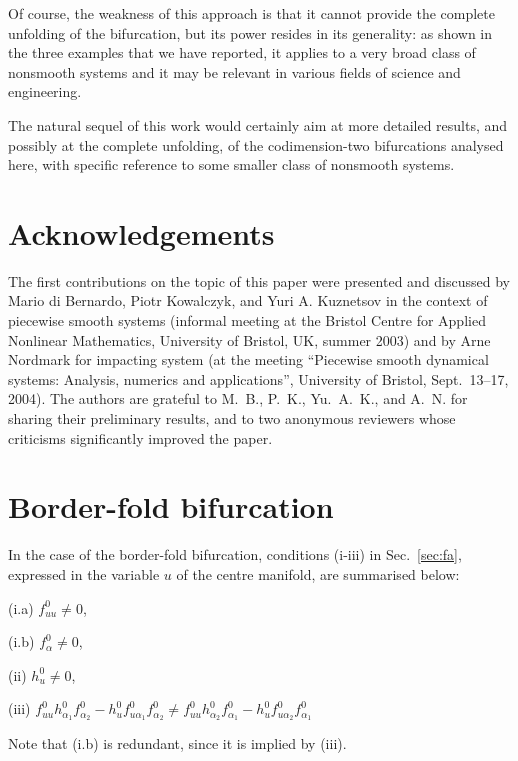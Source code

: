 \documentclass[final,onefignum]{siamltex}
\begin{document}
Of course, the weakness of this approach is that it cannot provide the complete unfolding of the bifurcation, but its power resides in its generality: as shown in the three examples that we have reported, it applies to a very broad class of nonsmooth systems and it may be relevant in various fields of science and engineering.

The natural sequel of this work would certainly aim at more detailed results, and possibly at the complete unfolding, of the codimension-two bifurcations analysed here, with specific reference to some smaller class of nonsmooth systems. 

\section*{Acknowledgements}
The first contributions on the topic of this paper were presented and discussed by Mario di Bernardo, Piotr Kowalczyk, and Yuri A. Kuznetsov in the context of piecewise smooth systems (informal meeting at the Bristol Centre for Applied Nonlinear Mathematics, University of Bristol, UK, summer 2003) and by Arne Nordmark for impacting system (at the meeting ``Piecewise smooth dynamical systems: Analysis, numerics and applications'', University of Bristol, Sept.~13--17, 2004).
The authors are grateful to M.~B., P.~K., Yu.~A.~K., and A.~N. for sharing their preliminary results, and to two anonymous reviewers whose criticisms significantly improved the paper.




\newpage

\appendix
\section{Border-fold bifurcation}
In the case of the border-fold bifurcation, conditions (i-iii) in Sec.~\ref{sec:fa}, expressed in the variable $u$ of the centre manifold, are summarised below:
\begin{list}{C}{}
 \item[(i.a)] $f_{uu}^0\neq 0$,
 \item[(i.b)] $f_{\alpha}^0\neq 0$,
 \item[(ii)] $h_u^0\neq 0$,
 \item[(iii)] $f_{uu}^0h_{\alpha_1}^0f_{\alpha_2}^0 - h_u^0f_{u\alpha_1}^0f_{\alpha_2}^0 \neq f_{uu}^0h_{\alpha_2}^0f_{\alpha_1}^0 - h_{u}^0f_{u\alpha_2}^0f_{\alpha_1}^0$
\end{list}
Note that (i.b) is redundant, since it is implied by (iii).
\end{document}
